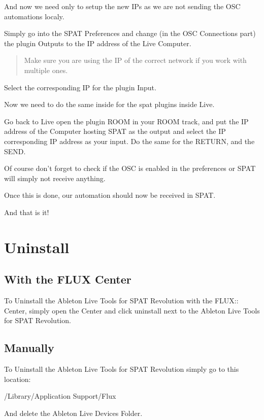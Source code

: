\documentclass[
  letterpaper,
  DIV=11,
  numbers=noendperiod]{scrreport}
\begin{document}
And now we need only to setup the new IPs as we are not sending the OSC
automations localy.

Simply go into the SPAT Preferences and change (in the OSC Connections
part) the plugin Outputs to the IP address of the Live Computer.

\begin{quote}
Make sure you are using the IP of the correct network if you work with
multiple ones.
\end{quote}

Select the corresponding IP for the plugin Input.

Now we need to do the same inside for the spat plugins inside Live.

Go back to Live open the plugin ROOM in your ROOM track, and put the IP
address of the Computer hosting SPAT as the output and select the IP
corresponding IP address as your input. Do the same for the RETURN, and
the SEND.

Of course don't forget to check if the OSC is enabled in the preferences
or SPAT will simply not receive anything.

Once this is done, our automation should now be received in SPAT.

And that is it!

\hypertarget{uninstall}{%
\section{Uninstall}\label{uninstall}}

\hypertarget{with-the-flux-center}{%
\subsection{With the FLUX Center}\label{with-the-flux-center}}

To Uninstall the Ableton Live Tools for SPAT Revolution with the FLUX::
Center, simply open the Center and click uninstall next to the Ableton
Live Tools for SPAT Revolution.

\hypertarget{manually}{%
\subsection{Manually}\label{manually}}

To Uninstall the Ableton Live Tools for SPAT Revolution simply go to
this location:

/Library/Application Support/Flux

And delete the Ableton Live Devices Folder.
\end{document}

